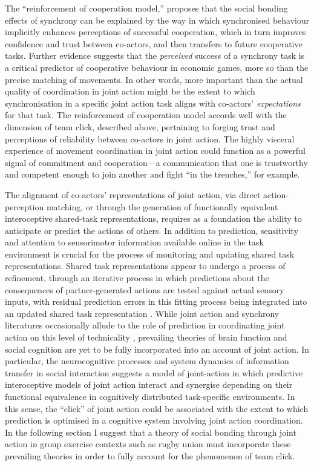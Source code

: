 \begin{CJK}{UTF8}{gbsn}
{The ``reinforcement of cooperation model,'' proposes that the social bonding effects of synchrony can be explained by the way in which synchronised behaviour implicitly enhances perceptions of successful cooperation, which in turn improves confidence and trust between co-actors, and then transfers to future cooperative tasks.  Further evidence suggests that the \textit{perceived} success of a synchrony task is a critical predictor of cooperative behaviour in economic games, more so than the precise matching of movements\citep{Kurzban2001,Launay2013}.  In other words, more important than the actual quality of coordination in joint action might be the extent to which synchronisation in a specific joint action task aligns with co-actors' \textit{expectations} for that task.  The reinforcement of cooperation model accords well with the dimension of team click, described above, pertaining to forging trust and perceptions of reliability between co-actors in joint action.
The highly visceral experience of movement coordination in joint action could function as a powerful signal of commitment and cooperation---a communication that one is trustworthy and competent enough to join another and fight ``in the trenches,'' for example.



The alignment of co-actors' representations of joint action, via direct action-perception matching, or through the generation of functionally equivalent interoceptive shared-task representations, requires as a foundation the ability to anticipate or predict the actions of others.  In addition to prediction, sensitivity and attention to sensorimotor information available online in the task environment is crucial for the process of monitoring and updating shared task representations. Shared task representations appear to undergo a process of refinement, through an iterative process in which predictions about the consequences of partner-generated actions are tested against actual sensory inputs, with residual prediction errors in this fitting process being integrated into an updated shared task representation \citep{Vesper2016}. While joint action and synchrony literatures occasionally allude to the role of prediction in coordinating joint action on this level of technicality \citep[see for example][]{Sebanz2009,Glover2017}, prevailing theories of brain function and social cognition are yet to be fully incorporated into an account of joint action.  In particular, the neurocognitive processes and system dynamics of information transfer in social interaction suggests a model of joint-action in which predictive interoceptive models of joint action interact and synergise depending on their functional equivalence in cognitively distributed task-specific environments. In this sense, the ``click'' of joint action could be associated with the extent to which prediction is optimised in a cognitive system involving joint action coordination.  In the following section I suggest that a theory of social bonding through joint action in group exercise contexts such as rugby union must incorporate these prevailing theories in order to fully account for the phenomenon of team click.

}
\end{CJK}
